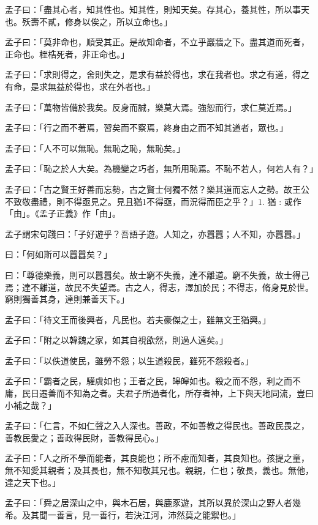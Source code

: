 
\begin{pinyinscope}
孟子曰：「盡其心者，知其性也。知其性，則知天矣。存其心，養其性，所以事天也。殀壽不貳，修身以俟之，所以立命也。」

孟子曰：「莫非命也，順受其正。是故知命者，不立乎巖牆之下。盡其道而死者，正命也。桎梏死者，非正命也。」

孟子曰：「求則得之，舍則失之，是求有益於得也，求在我者也。求之有道，得之有命，是求無益於得也，求在外者也。」

孟子曰：「萬物皆備於我矣。反身而誠，樂莫大焉。強恕而行，求仁莫近焉。」

孟子曰：「行之而不著焉，習矣而不察焉，終身由之而不知其道者，眾也。」

孟子曰：「人不可以無恥。無恥之恥，無恥矣。」

孟子曰：「恥之於人大矣。為機變之巧者，無所用恥焉。不恥不若人，何若人有？」

孟子曰：「古之賢王好善而忘勢，古之賢士何獨不然？樂其道而忘人之勢。故王公不致敬盡禮，則不得亟見之。見且猶1不得亟，而況得而臣之乎？」1. 猶 : 或作「由」。《孟子正義》作「由」。

孟子謂宋句踐曰：「子好遊乎？吾語子遊。人知之，亦囂囂；人不知，亦囂囂。」

曰：「何如斯可以囂囂矣？」

曰：「尊德樂義，則可以囂囂矣。故士窮不失義，達不離道。窮不失義，故士得己焉；達不離道，故民不失望焉。古之人，得志，澤加於民；不得志，脩身見於世。窮則獨善其身，達則兼善天下。」

孟子曰：「待文王而後興者，凡民也。若夫豪傑之士，雖無文王猶興。」

孟子曰：「附之以韓魏之家，如其自視欿然，則過人遠矣。」

孟子曰：「以佚道使民，雖勞不怨；以生道殺民，雖死不怨殺者。」

孟子曰：「霸者之民，驩虞如也；王者之民，皞皞如也。殺之而不怨，利之而不庸，民日遷善而不知為之者。夫君子所過者化，所存者神，上下與天地同流，豈曰小補之哉？」

孟子曰：「仁言，不如仁聲之入人深也。善政，不如善教之得民也。善政民畏之，善教民愛之；善政得民財，善教得民心。」

孟子曰：「人之所不學而能者，其良能也；所不慮而知者，其良知也。孩提之童，無不知愛其親者；及其長也，無不知敬其兄也。親親，仁也；敬長，義也。無他，達之天下也。」

孟子曰：「舜之居深山之中，與木石居，與鹿豕遊，其所以異於深山之野人者幾希。及其聞一善言，見一善行，若決江河，沛然莫之能禦也。」


\end{pinyinscope}
